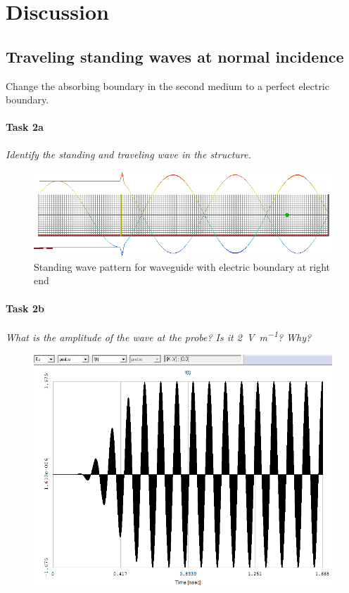 \section{Discussion}\label{sec:discussion}
\subsection{Traveling standing waves at normal incidence}

Change the absorbing boundary in the second medium to a perfect electric boundary.

\paragraph{Task 2a} \textit{Identify the standing and traveling wave in the structure.}
\begin{figure}[tbph]
	\centering
	\includegraphics[width=0.95\linewidth]{graphics/Task2-2a-Standing-better-envelope}
	\caption{Standing wave pattern for waveguide with electric boundary at right end}
	\label{fig:Task2-2a-Standing-better-envelope}
\end{figure}

\paragraph{Task 2b} \textit{What is the amplitude of the wave at the probe? Is it \SI{2}{\volt\per\meter}? Why?}
\begin{figure}[tbph]
	\centering
	\includegraphics[width=0.6\linewidth]{graphics/Task2-2b-Amplitude}
\end{figure}

